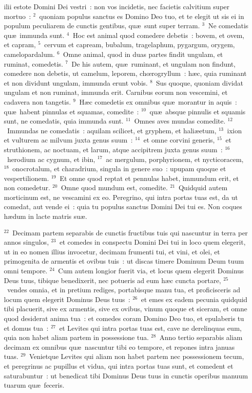 \bchapter
{}ilii estote Domini Dei vestri~: non vos incidetis, nec facietis calvitium super mortuo~:
${}^{2}$~quoniam populus sanctus es Domino Deo tuo, et te elegit ut sis ei in populum peculiarem de cunctis gentibus, qu\ae\ sunt super terram.
${}^{3}$~Ne comedatis qu\ae\ immunda sunt.
${}^{4}$~Hoc est animal quod comedere debetis~: bovem, et ovem, et capram,
${}^{5}$~cervum et capream, bubalum, tragelaphum, pygargum, orygem, camelopardalum.
${}^{6}$~Omne animal, quod in duas partes findit ungulam, et ruminat, comedetis.
${}^{7}$~De his autem, qu\ae\ ruminant, et ungulam non findunt, comedere non debetis, ut camelum, leporem, chœrogryllum~: h\ae c, quia ruminant et non dividunt ungulam, immunda erunt vobis.
${}^{8}$~Sus quoque, quoniam dividat ungulam et non ruminat, immunda erit. Carnibus eorum non vescemini, et cadavera non tangetis.
${}^{9}$~H\ae c comedetis ex omnibus qu\ae\ morantur in aquis~: qu\ae\ habent pinnulas et squamas, comedite~:
${}^{10}$~qu\ae\ absque pinnulis et squamis sunt, ne comedatis, quia immunda sunt.
${}^{11}$~Omnes aves mundas comedite.
${}^{12}$~Immundas ne comedatis~: aquilam scilicet, et gryphem, et hali\ae etum,
${}^{13}$~ixion et vulturem ac milvum juxta genus suum~:
${}^{14}$~et omne corvini generis,
${}^{15}$~et struthionem, ac noctuam, et larum, atque accipitrem juxta genus suum~:
${}^{16}$~herodium ac cygnum, et ibin,
${}^{17}$~ac mergulum, porphyrionem, et nycticoracem,
${}^{18}$~onocrotalum, et charadrium, singula in genere suo~: upupam quoque et vespertilionem.
${}^{19}$~Et omne quod reptat et pennulas habet, immundum erit, et non comedetur.
${}^{20}$~Omne quod mundum est, comedite.
${}^{21}$~Quidquid autem morticinum est, ne vescamini ex eo. Peregrino, qui intra portas tuas est, da ut comedat, aut vende ei~: quia tu populus sanctus Domini Dei tui es. Non coques h\ae dum in lacte matris su\ae .


${}^{22}$~Decimam partem separabis de cunctis fructibus tuis qui nascuntur in terra per annos singulos,
${}^{23}$~et comedes in conspectu Domini Dei tui in loco quem elegerit, ut in eo nomen illius invocetur, decimam frumenti tui, et vini, et olei, et primogenita de armentis et ovibus tuis~: ut discas timere Dominum Deum tuum omni tempore.
${}^{24}$~Cum autem longior fuerit via, et locus quem elegerit Dominus Deus tuus, tibique benedixerit, nec potueris ad eum h\ae c cuncta portare,
${}^{25}$~vendes omnia, et in pretium rediges, portabisque manu tua, et proficisceris ad locum quem elegerit Dominus Deus tuus~:
${}^{26}$~et emes ex eadem pecunia quidquid tibi placuerit, sive ex armentis, sive ex ovibus, vinum quoque et siceram, et omne quod desiderat anima tua~: et comedes coram Domino Deo tuo, et epulaberis tu et domus tua~:
${}^{27}$~et Levites qui intra portas tuas est, cave ne derelinquas eum, quia non habet aliam partem in possessione tua.
${}^{28}$~Anno tertio separabis aliam decimam ex omnibus qu\ae\ nascuntur tibi eo tempore, et repones intra januas tuas.
${}^{29}$~Venietque Levites qui aliam non habet partem nec possessionem tecum, et peregrinus ac pupillus et vidua, qui intra portas tuas sunt, et comedent et saturabuntur~: ut benedicat tibi Dominus Deus tuus in cunctis operibus manuum tuarum qu\ae\ feceris.

